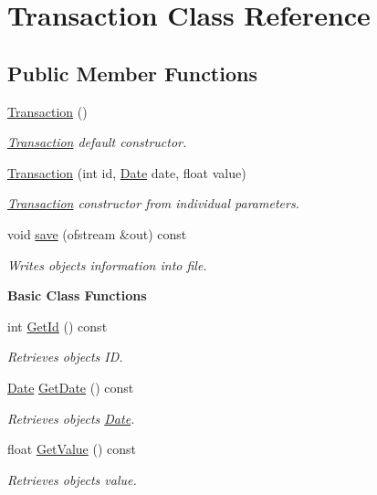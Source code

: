 \hypertarget{class_transaction}{}\section{Transaction Class Reference}
\label{class_transaction}
\subsection*{Public Member Functions}
\begin{DoxyCompactItemize}
\item 
\hyperlink{group___transaction_gab47005b855d38bc324bb79fd023baa13}{Transaction} ()
\begin{DoxyCompactList}\small\item\em \hyperlink{class_transaction}{Transaction} default constructor. \end{DoxyCompactList}\item 
\hyperlink{group___transaction_ga6bba02c02aace16e90745fecd2e4697d}{Transaction} (int id, \hyperlink{class_date}{Date} date, float value)
\begin{DoxyCompactList}\small\item\em \hyperlink{class_transaction}{Transaction} constructor from individual parameters. \end{DoxyCompactList}\item 
void \hyperlink{group___transaction_ga56b1bd622e55266bf795fb01e04e8a21}{save} (ofstream \&out) const
\begin{DoxyCompactList}\small\item\em Writes object\textquotesingle{}s information into file. \end{DoxyCompactList}\end{DoxyCompactItemize}
\begin{Indent}\textbf{ Basic Class Functions}\par
\begin{DoxyCompactItemize}
\item 
int \hyperlink{group___transaction_ga73ff525f9baae732b1256533736e5052}{Get\+Id} () const
\begin{DoxyCompactList}\small\item\em Retrieves object\textquotesingle{}s ID. \end{DoxyCompactList}\item 
\hyperlink{class_date}{Date} \hyperlink{group___transaction_ga05b17fe71d38937648b77f964df4de5d}{Get\+Date} () const
\begin{DoxyCompactList}\small\item\em Retrieves object\textquotesingle{}s \hyperlink{class_date}{Date}. \end{DoxyCompactList}\item 
float \hyperlink{group___transaction_ga3dca9a51e64e6fcb07f501eb2724676d}{Get\+Value} () const
\begin{DoxyCompactList}\small\item\em Retrieves object\textquotesingle{}s value. \end{DoxyCompactList}\end{DoxyCompactItemize}
\end{Indent}
